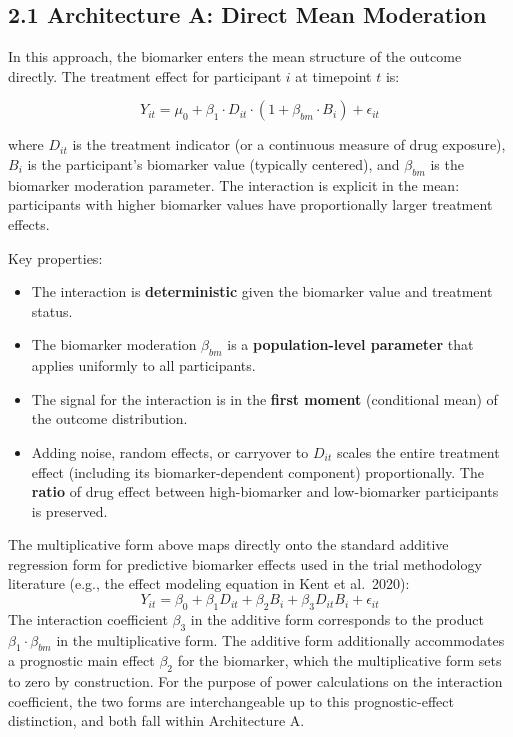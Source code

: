 \documentclass[
]{article}
\begin{document}
\subsection{2.1 Architecture A: Direct Mean Moderation}

In this approach, the biomarker enters the mean structure of the
outcome directly. The treatment effect for participant \(i\) at
timepoint \(t\) is:

\[Y_{it} = \mu_0 + \beta_1 \cdot D_{it} \cdot (1 + \beta_{bm}
\cdot B_i) + \epsilon_{it}\]

where \(D_{it}\) is the treatment indicator (or a continuous measure
of drug exposure), \(B_i\) is the participant's biomarker value
(typically centered), and \(\beta_{bm}\) is the biomarker moderation
parameter. The interaction is explicit in the mean: participants
with higher biomarker values have proportionally larger treatment
effects.

Key properties:

\begin{itemize}
\item The interaction is \textbf{deterministic} given the biomarker value
  and treatment status.
\item The biomarker moderation $\beta_{bm}$ is a \textbf{population-level
  parameter} that applies uniformly to all participants.
\item The signal for the interaction is in the \textbf{first moment}
  (conditional mean) of the outcome distribution.
\item Adding noise, random effects, or carryover to $D_{it}$ scales
  the entire treatment effect (including its biomarker-dependent
  component) proportionally. The \textbf{ratio} of drug effect between
  high-biomarker and low-biomarker participants is preserved.
\end{itemize}

The multiplicative form above maps directly onto the standard
additive regression form for predictive biomarker effects used
in the trial methodology literature (e.g., the effect modeling
equation in Kent et al.~2020):
\[Y_{it} = \beta_0 + \beta_1 D_{it} + \beta_2 B_i + \beta_3
D_{it} B_i + \epsilon_{it}\]
The interaction coefficient \(\beta_3\) in the additive form
corresponds to the product \(\beta_1 \cdot \beta_{bm}\) in the
multiplicative form. The additive form additionally accommodates
a prognostic main effect \(\beta_2\) for the biomarker, which the
multiplicative form sets to zero by construction. For the
purpose of power calculations on the interaction coefficient,
the two forms are interchangeable up to this prognostic-effect
distinction, and both fall within Architecture A.
\end{document}
